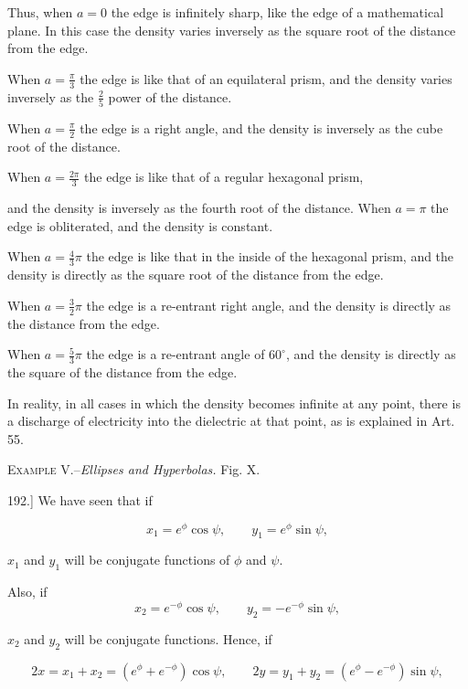 \documentclass[11pt,a4paper]{article}
\begin{document}
Thus, when $a=0$ the edge is infinitely sharp, like the edge of a mathematical plane. In this case the density varies inversely as the square root of the distance from the edge.

When $a=\frac{\pi}{3}$ the edge is like that of an equilateral prism, and the density varies inversely as the $\frac{2}{5}$ power of the distance.

When $a=\frac{\pi}{2}$ the edge is a right angle, and the density is inversely as the cube root of the distance.

When $a=\frac{2\pi}{3}$ the edge is like that of a regular hexagonal prism,

and the density is inversely as the fourth root of the distance. When $a=\pi$ the edge is obliterated, and the density is constant.

When $a=\frac{4}{3}\pi$ the edge is like that in the inside of the hexagonal prism, and the density is directly as the square root of the distance from the edge.

When $a=\frac{3}{2}\pi$ the edge is a re-entrant right angle, and the density is directly as the distance from the edge.

When $a=\frac{5}{3}\pi$ the edge is a re-entrant angle of $60^\circ$, and the density is directly as the square of the distance from the edge.

In reality, in all cases in which the density becomes infinite at any point, there is a discharge of electricity into the dielectric at that point, as is explained in Art. 55.

\begin{center}
\textsc{Example V.}--\textit{Ellipses and Hyperbolas.} \quad Fig. X.
\end{center}

192.] We have seen that if

\begin{equation}\tag{1}
x_1=e^\phi\cos\psi,\qquad y_1=e^\phi\sin\psi,
\end{equation}

$x_1$ and $y_1$ will be conjugate functions of $\phi$ and $\psi$.

Also, if
\begin{equation}\tag{2}
x_2=e^{-\phi}\cos\psi,\qquad y_2=-e^{-\phi}\sin\psi,
\end{equation}

$x_2$ and $y_2$ will be conjugate functions. Hence, if

\begin{equation}\tag{3}
2x=x_1+x_2=(e^\phi+e^{-\phi})\cos\psi,\qquad
2y=y_1+y_2=(e^\phi-e^{-\phi})\sin\psi,
\end{equation}
\end{document}
